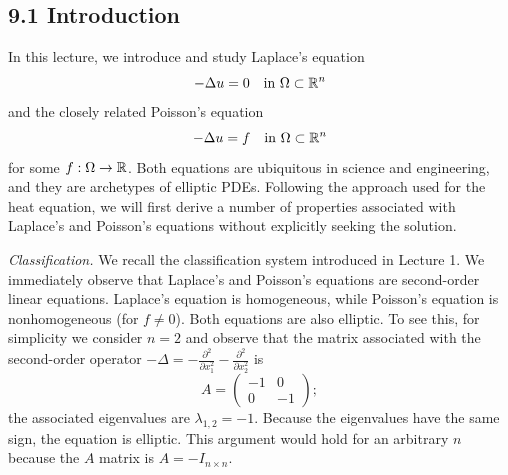 

\subsection{9.1 Introduction}
In this lecture, we introduce and study Laplace's equation
\[-\Delta u = 0 \quad \text{in } \Omega \subset \mathbb{R}^n\]
and the closely related Poisson's equation
\[-\Delta u = f \quad \text{in } \Omega \subset \mathbb{R}^n\]
for some $f : \Omega \to \mathbb{R}$. Both equations are ubiquitous in science and engineering, and they are archetypes of elliptic PDEs. Following the approach used for the heat equation, we will first derive a number of properties associated with Laplace's and Poisson's equations without explicitly seeking the solution.

\textit{Classification.} We recall the classification system introduced in Lecture 1. We immediately observe that Laplace's and Poisson's equations are second-order linear equations. Laplace's equation is homogeneous, while Poisson's equation is nonhomogeneous (for $f \neq 0$). Both equations are also elliptic. To see this, for simplicity we consider $n = 2$ and observe that the matrix associated with the second-order operator $-\Delta = -\frac{\partial^2}{\partial x_1^2} - \frac{\partial^2}{\partial x_2^2}$ is
\[A = \begin{pmatrix} -1 & 0 \\ 0 & -1 \end{pmatrix};\]
the associated eigenvalues are $\lambda_{1,2} = -1$. Because the eigenvalues have the same sign, the equation is elliptic. This argument would hold for an arbitrary $n$ because the $A$ matrix is $A = -I_{n \times n}$.

